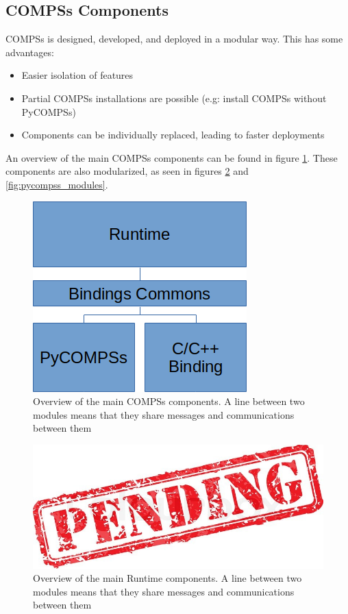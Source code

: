 \subsection{COMPSs Components}
\label{subsec:compss_components}
COMPSs is designed, developed, and deployed in a modular way. This has some advantages:
\begin{itemize} 
\item Easier isolation of features
\item Partial COMPSs installations are possible (e.g: install COMPSs without PyCOMPSs)
\item Components can be individually replaced, leading to faster deployments
\end{itemize}
An overview of the main COMPSs components can be found in figure \ref{fig:compss_modules}. These components are also modularized, as seen in figures \ref{fig:runtime_modules} and \ref{fig:pycompss_modules}.
\begin{figure}
\centering
\includegraphics{figures/compss_modules.png}
\caption{Overview of the main COMPSs components. A line between two modules means that they share messages and communications between them}
\label{fig:compss_modules}
\end{figure}

\begin{figure}
\centering
\includegraphics{figures/pending.jpg}
\caption{Overview of the main Runtime components. A line between two modules means that they share messages and communications between them}
\label{fig:runtime_modules}
\end{figure}

